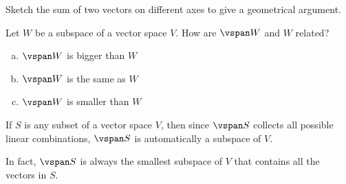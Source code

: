\begin{applicationActivities}
\begin{activity}{10}
  \begin{instructorNote}
    Sketch the sum of two vectors on different axes to give a geometrical
    argument.
  \end{instructorNote}
\end{activity}

%



\begin{activity}{5}
Let \(W\) be a subspace of a vector space \(V\).  How are \(\vspan W\) and \(W\) related?
\begin{enumerate}[(a)]
\item \(\vspan W\) is bigger than \(W\)
\item \(\vspan W\) is the same as \(W\)
\item \(\vspan W\) is smaller than \(W\)
\end{enumerate}
\end{activity}

\begin{fact}
  If \(S\) is any subset of a vector space \(V\), then
  since \(\vspan S\) collects all possible linear combinations,
  \(\vspan S\) is automatically a subspace of \(V\).

  \vspace{1em}

  In fact, \(\vspan S\) is always the smallest
  subspace of \(V\) that contains all the vectors in \(S\).
\end{fact}

\end{applicationActivities}
